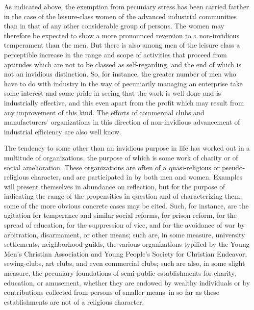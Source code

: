 \documentclass[12pt]{report}
\begin{document}
As indicated above, the exemption from pecuniary stress has been
carried farther in the case of the leisure-class women of the advanced
industrial communities than in that of any other considerable group of
persons. The women may therefore be expected to show a more pronounced
reversion to a non-invidious temperament than the men. But there is also
among men of the leisure class a perceptible increase in the range and
scope of activities that proceed from aptitudes which are not to be
classed as self-regarding, and the end of which is not an invidious
distinction. So, for instance, the greater number of men who have to do
with industry in the way of pecuniarily managing an enterprise take
some interest and some pride in seeing that the work is well done and
is industrially effective, and this even apart from the profit which
may result from any improvement of this kind. The efforts of
commercial clubs and manufacturers' organizations in this direction of
non-invidious advancement of industrial efficiency are also well know.

The tendency to some other than an invidious purpose in life has worked
out in a multitude of organizations, the purpose of which is some work
of charity or of social amelioration. These organizations are often of
a quasi-religious or pseudo-religious character, and are participated in
by both men and women. Examples will present themselves in abundance
on reflection, but for the purpose of indicating the range of the
propensities in question and of characterizing them, some of the
more obvious concrete cases may be cited. Such, for instance, are the
agitation for temperance and similar social reforms, for prison reform,
for the spread of education, for the suppression of vice, and for the
avoidance of war by arbitration, disarmament, or other means; such
are, in some measure, university settlements, neighborhood guilds, the
various organizations typified by the Young Men's Christian Association
and Young People's Society for Christian Endeavor, sewing-clubs, art
clubs, and even commercial clubs; such are also, in some slight measure,
the pecuniary foundations of semi-public establishments for charity,
education, or amusement, whether they are endowed by wealthy individuals
or by contributions collected from persons of smaller means--in so far
as these establishments are not of a religious character.
\end{document}
